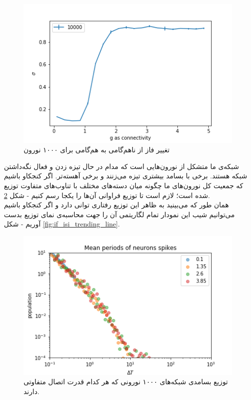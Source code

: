 \documentclass[12pt,onecolumn,a4paper]{article}
\begin{document}
\begin{figure}[h]
\centering
  \includegraphics[width = 10 cm]{../papers_studies/figs/IF/sigma.png}
 \caption{تغییر فاز از ناهم‌گامی به هم‌گامی برای ۱۰۰۰ نورون}
  \label{fig:if_phase_transition}
\end{figure}

شبکه‌ی ما متشکل از نورون‌هایی است که مدام در حال تیزه زدن و فعال نگه‌داشتن شبکه هستند. برخی با بسامد بیشتری تیزه می‌زنند و برخی آهسته‌تر. اگر کنجکاو باشیم که جمعیت کل نورون‌های ما چگونه میان دسته‌های مختلف با تناوب‌های متفاوت توزیع شده‌ است؛ لازم است تا توزیع فراوانی آن‌ها را یکجا رسم کنیم - شکل \ref{fig:if_isi}.\\
همان طور که می‌بینید به ظاهر این توزیع رفتاری توانی دارد و اگر کنجکاو باشیم می‌توانیم شیب این نمودار تمام لگاریتمی آن را جهت محاسبه‌ی نمای توزیع بدست آوریم - شکل \ref{fig:if_isi_trending_line}.
\begin{figure}[h]
\centering
  \includegraphics[width = 10 cm]{../papers_studies/figs/IF/mean_spiking_persiods.png}
 \caption{توزیع بسامدی شبکه‌های ۱۰۰۰ نورونی که هر کدام قدرت اتصال متفاوتی دارند. }
  \label{fig:if_isi}
\end{figure}
\end{document}
